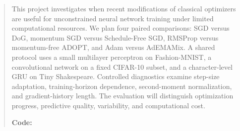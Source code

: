 \begin{abstract}
This project investigates when recent modifications of classical optimizers are useful for
unconstrained neural network training under limited computational resources. We plan four
paired comparisons: SGD versus DoG, momentum SGD versus Schedule-Free SGD, RMSProp versus
momentum-free ADOPT, and Adam versus AdEMAMix. A shared protocol uses a small multilayer
perceptron on Fashion-MNIST, a convolutional network on a fixed CIFAR-10 subset, and a
character-level GRU on Tiny Shakespeare. Controlled diagnostics examine step-size adaptation,
training-horizon dependence, second-moment normalization, and gradient-history length.
The evaluation will distinguish optimization progress, predictive quality, variability,
and computational cost. 
\par\textbf{Code:} 
\end{abstract}
